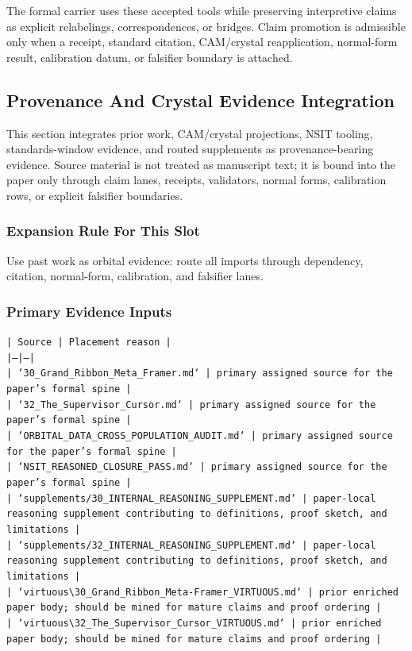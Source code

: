 \documentclass[11pt]{article}
\begin{document}
The formal carrier uses these accepted tools while preserving interpretive
claims as explicit relabelings, correspondences, or bridges. Claim promotion is admissible only when a receipt, standard citation,
CAM/crystal reapplication, normal-form result, calibration datum, or falsifier
boundary is attached.

\subsection*{Provenance And Crystal Evidence Integration}

This section integrates prior work, CAM/crystal projections, NSIT tooling,
standards-window evidence, and routed supplements as provenance-bearing
evidence. Source material is not treated as manuscript text; it is bound into
the paper only through claim lanes, receipts, validators, normal forms,
calibration rows, or explicit falsifier boundaries.

\subsubsection*{Expansion Rule For This Slot}

Use past work as orbital evidence: route all imports through dependency, citation, normal-form, calibration, and falsifier lanes.

\subsubsection*{Primary Evidence Inputs}

\noindent\texttt{| Source | Placement reason |}\\
\noindent\texttt{|---|---|}\\
\noindent\texttt{| `30\_Grand\_Ribbon\_Meta\_Framer.md` | primary assigned source for the paper's formal spine |}\\
\noindent\texttt{| `32\_The\_Supervisor\_Cursor.md` | primary assigned source for the paper's formal spine |}\\
\noindent\texttt{| `ORBITAL\_DATA\_CROSS\_POPULATION\_AUDIT.md` | primary assigned source for the paper's formal spine |}\\
\noindent\texttt{| `NSIT\_REASONED\_CLOSURE\_PASS.md` | primary assigned source for the paper's formal spine |}\\
\noindent\texttt{| `supplements/30\_INTERNAL\_REASONING\_SUPPLEMENT.md` | paper-local reasoning supplement contributing to definitions, proof sketch, and limitations |}\\
\noindent\texttt{| `supplements/32\_INTERNAL\_REASONING\_SUPPLEMENT.md` | paper-local reasoning supplement contributing to definitions, proof sketch, and limitations |}\\
\noindent\texttt{| `virtuous\textbackslash{}30\_Grand\_Ribbon\_Meta-Framer\_VIRTUOUS.md` | prior enriched paper body; should be mined for mature claims and proof ordering |}\\
\noindent\texttt{| `virtuous\textbackslash{}32\_The\_Supervisor\_Cursor\_VIRTUOUS.md` | prior enriched paper body; should be mined for mature claims and proof ordering |}\\
\end{document}
